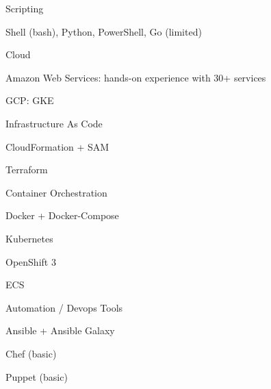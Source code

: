 

\begin{cvskills}

  \cvskill
    {Scripting} %
    {
      \begin{cvitems} %
        \item {Shell (bash), Python, PowerShell, Go (limited)} %
      \end{cvitems}
    }

  \cvskill
    {Cloud} %
    {
      \begin{cvitems} %
        \item {Amazon Web Services: hands-on experience with 30+ services} %
        \item {GCP: GKE} %
      \end{cvitems}
    }

  \cvskill
    {Infrastructure As Code} %
    {
      \begin{cvitems} %
        \item {CloudFormation + SAM} %
        \item {Terraform} %
      \end{cvitems}
    }

  \cvskill
    {Container Orchestration} %
    {
      \begin{cvitems} %
        \item {Docker + Docker-Compose} %
        \item {Kubernetes} %
        \item {OpenShift 3} %
        \item {ECS} %
      \end{cvitems}
    }

  \cvskill
    {Automation / Devops Tools} %
    {
      \begin{cvitems} %
        \item {Ansible + Ansible Galaxy} %
        \item {Chef (basic)} %
        \item {Puppet (basic)} %
      \end{cvitems}
    }


\end{cvskills}
